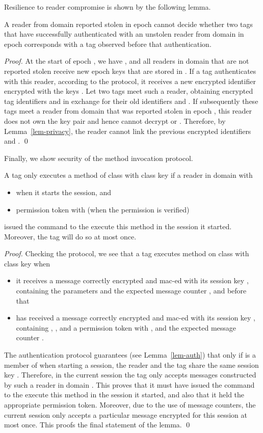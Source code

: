 Resilience to reader compromise is shown by the following lemma.
\begin{lemma}
A reader from domain  reported stolen in epoch  cannot decide
whether two tags that have successfully authenticated with an unstolen reader
from domain  in epoch  corresponds with a tag
observed before that authentication.
\end{lemma}
\begin{proof}
At the start of epoch , we have , and
all readers in domain  that are not reported stolen
receive new epoch keys  that are stored in . 
If a tag authenticates with this reader, according to the protocol, it receives
a new encrypted identifier encrypted with the keys
. Let two tags meet such a reader, obtaining encrypted 
tag identifiers  and  in exchange for their old
identifiers  and .
If subsequently these tags meet a reader from domain  that was
reported stolen in epoch , this reader does not own the
key pair  and hence cannot decrypt  or . 
Therefore, by Lemma~\ref{lem-privacy}, the reader cannot link the
previous encrypted identifiers  and .
\qed
\end{proof}



Finally, we show security of the method invocation protocol.
\begin{lemma}
A tag   only executes a method  of class  
with class key  if a reader in domain  
with
\begin{itemize}
\fixlistspacing
\item  when it starts the session, and
\item permission token  
with  (when the permission is verified)
\end{itemize}
issued the command to the execute this method in the session it started. Moreover,
the tag will do so at most once.
\end{lemma}
\begin{proof}
Checking the protocol, we see that a tag  executes method 
on class  with class key  when
\begin{itemize}
\fixlistspacing
\item it receives a message correctly encrypted and
mac-ed with its session key , containing the parameters and the expected
message counter , and before that
\item has received a message correctly encrypted and
mac-ed with its session key , containing 
, ,  and 
a permission token  with
, and the expected message counter .
\end{itemize}
The authentication protocol guarantees (see Lemma~\ref{lem-auth}) that
only if  is a member of 
when starting a session, the reader and the tag 
share the same session key .
Therefore, in the current session the tag only accepts messages
constructed by such a  reader in domain . This proves that
it must have issued the command to the execute this method in the session
it started, and also that it held the appropriate permission token.
Moreover, due to the use of message counters, the current session only accepts
a particular message encrypted for this session at most once.
This proofs the final statement of the lemma.
\qed
\end{proof}



